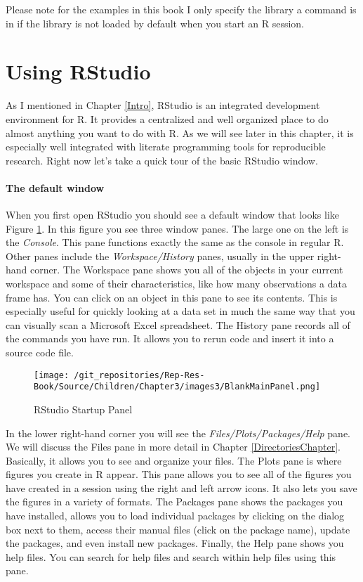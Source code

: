 {\noindent Please note for the examples in this book I only specify the library a command is in if the library is not loaded by default when you start an R session. 

\section{Using RStudio}

As I mentioned in Chapter \ref{Intro}, RStudio is an integrated development environment for R. It provides a centralized and well organized place to do almost anything you want to do with R. As we will see later in this chapter, it is especially well integrated with literate programming tools for reproducible research. Right now let's take a quick tour of the basic RStudio window.

\paragraph{The default window}

When you first open RStudio you should see a default window that looks like Figure \ref{BlankMain}. In this figure you see three window panes. The large one on the left is the {\emph{Console}}. This pane functions exactly the same as the console in regular R. Other panes include the {\emph{Workspace/History}} panes, usually in the upper right-hand corner. The Workspace pane shows you all of the objects in your current workspace and some of their characteristics, like how many observations a data frame has. You can click on an object in this pane to see its contents. This is especially useful for quickly looking at a data set in much the same way that you can visually scan a Microsoft Excel spreadsheet. The History pane records all of the commands you have run. It allows you to rerun code and insert it into a source code file.

\begin{figure}[ht]
    \caption{RStudio Startup Panel}
    \label{BlankMain}
    \begin{center}
    \texttt{[image: /git\_repositories/Rep-Res-Book/Source/Children/Chapter3/images3/BlankMainPanel.png]}
    \end{center}
\end{figure}

In the lower right-hand corner you will see the {\emph{Files/Plots/Packages/Help}} pane. We will discuss the Files pane in more detail in Chapter \ref{DirectoriesChapter}. Basically, it allows you to see and organize your files. The Plots pane is where figures you create in R appear. This pane allows you to see all of the figures you have created in a session using the right and left arrow icons. It also lets you save the figures in a variety of formats. The Packages pane shows the packages you have installed, allows you to load individual packages by clicking on the dialog box next to them, access their manual files (click on the package name), update the packages, and even install new packages. Finally, the Help pane shows you help files. You can search for help files and search within help files using this pane.  

}
